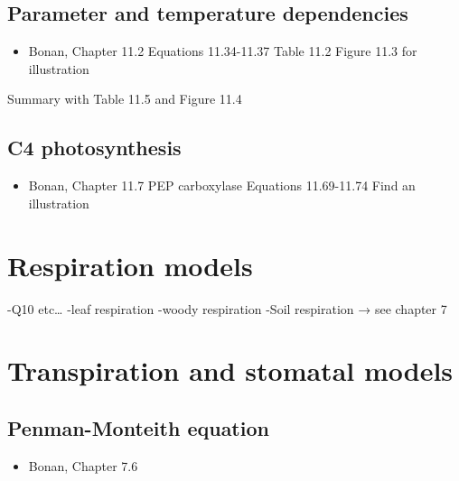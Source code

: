 \documentclass[
  oneside]{book}
\providecommand{\tightlist}{%
  \setlength{\itemsep}{0pt}\setlength{\parskip}{0pt}}
\begin{document}
\hypertarget{parameter-and-temperature-dependencies}{%
\subsection{Parameter and temperature dependencies}\label{parameter-and-temperature-dependencies}}

\begin{itemize}
\tightlist
\item
  Bonan, Chapter 11.2
  Equations 11.34-11.37
  Table 11.2
  Figure 11.3 for illustration
\end{itemize}

Summary with Table 11.5 and Figure 11.4

\hypertarget{c4-photosynthesis}{%
\subsection{C4 photosynthesis}\label{c4-photosynthesis}}

\begin{itemize}
\tightlist
\item
  Bonan, Chapter 11.7
  PEP carboxylase
  Equations 11.69-11.74
  Find an illustration
\end{itemize}

\hypertarget{respiration-models}{%
\section{Respiration models}\label{respiration-models}}

-Q10 etc\ldots{}
-leaf respiration
-woody respiration
-Soil respiration → see chapter 7

\hypertarget{transpiration-and-stomatal-models}{%
\section{Transpiration and stomatal models}\label{transpiration-and-stomatal-models}}

\hypertarget{penman-monteith-equation}{%
\subsection{Penman-Monteith equation}\label{penman-monteith-equation}}

\begin{itemize}
\tightlist
\item
  Bonan, Chapter 7.6
\end{itemize}
\end{document}

